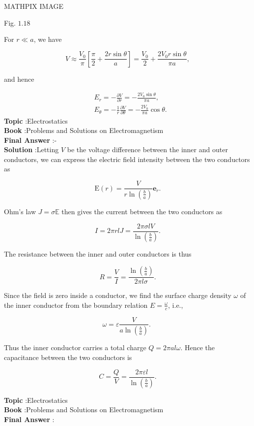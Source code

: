 \documentclass[10pt]{article}
\begin{document}
MATHPIX IMAGE

Fig. $1.18$

 For $r \ll a$, we have

$$
V \approx \frac{V_{0}}{\pi}\left[\frac{\pi}{2}+\frac{2 r \sin \theta}{a}\right]=\frac{V_{0}}{2}+\frac{2 V_{0} r \sin \theta}{\pi a},
$$

and hence

$$
\begin{aligned}
&E_{r}=-\frac{\partial V}{\partial r}=-\frac{2 V_{0} \sin \theta}{\pi a}, \\
&E_{\theta}=-\frac{1}{r} \frac{\partial V}{\partial \theta}=-\frac{2 V_{0}}{\pi a} \cos \theta .
\end{aligned}
$$
\textbf{Topic} :Electrostatics\\
\textbf{Book} :Problems and Solutions on Electromagnetism\\
\textbf{Final Answer} :- \cos \theta\\


\textbf{Solution} :Letting $V$ be the voltage difference between the inner and outer conductors, we can express the electric field intensity between the two conductors as

$$
\mathrm{E}(r)=\frac{V}{r \ln \left(\frac{b}{a}\right)} \mathbf{e}_{r} .
$$

Ohm's law $J=\sigma \mathbb{E}$ then gives the current between the two conductors as

$$
I=2 \pi r l J=\frac{2 \pi \sigma l V}{\ln \left(\frac{b}{a}\right)} .
$$

The resistance between the inner and outer conductors is thus

$$
R=\frac{V}{I}=\frac{\ln \left(\frac{b}{a}\right)}{2 \pi l \sigma} .
$$

Since the field is zero inside a conductor, we find the surface charge density $\omega$ of the inner conductor from the boundary relation $E=\frac{\omega}{c}$, i.e.,

$$
\omega=\varepsilon \frac{V}{a \ln \left(\frac{b}{a}\right)} \text {. }
$$

Thus the inner conductor carries a total charge $Q=2 \pi a l \omega$. Hence the capacitance between the two conductors is

$$
C=\frac{Q}{V}=\frac{2 \pi \varepsilon l}{\ln \left(\frac{b}{a}\right)} .
$$

\textbf{Topic} :Electrostatics\\
\textbf{Book} :Problems and Solutions on Electromagnetism\\
\textbf{Final Answer} :\\
\end{document}
